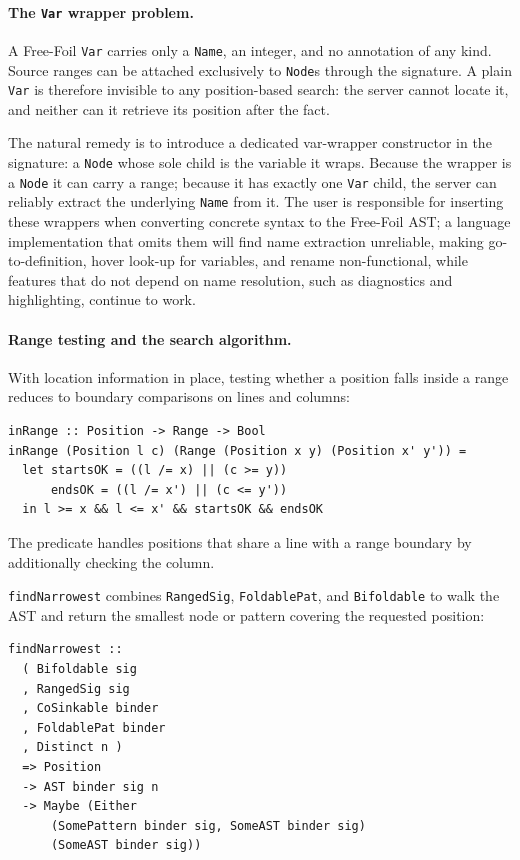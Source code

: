 \paragraph{The \texttt{Var} wrapper problem.}
A Free-Foil \texttt{Var} carries only a \texttt{Name}, an integer, and no annotation of any kind.
Source ranges can be attached exclusively to \texttt{Node}s through the signature.
A plain \texttt{Var} is therefore invisible to any position-based search: the server cannot locate it, and neither can it retrieve its position after the fact.

The natural remedy is to introduce a dedicated var-wrapper constructor in the signature: a \texttt{Node} whose sole child is the variable it wraps.
Because the wrapper is a \texttt{Node} it can carry a range; because it has exactly one \texttt{Var} child, the server can reliably extract the underlying \texttt{Name} from it.
The user is responsible for inserting these wrappers when converting concrete syntax to the Free-Foil AST; a language implementation that omits them will find name extraction unreliable, making go-to-definition, hover look-up for variables, and rename non-functional, while features that do not depend on name resolution, such as diagnostics and highlighting, continue to work.

\paragraph{Range testing and the search algorithm.}
With location information in place, testing whether a position falls inside a range reduces to boundary comparisons on lines and columns:

\begin{verbatim}
inRange :: Position -> Range -> Bool
inRange (Position l c) (Range (Position x y) (Position x' y')) =
  let startsOK = ((l /= x) || (c >= y))
      endsOK = ((l /= x') || (c <= y'))
  in l >= x && l <= x' && startsOK && endsOK
\end{verbatim}

The predicate handles positions that share a line with a range boundary by additionally checking the column.

\texttt{findNarrowest} combines \texttt{RangedSig}, \texttt{FoldablePat}, and \texttt{Bifoldable} to walk the AST and return the smallest node or pattern covering the requested position:

\begin{verbatim}
findNarrowest :: 
  ( Bifoldable sig
  , RangedSig sig
  , CoSinkable binder
  , FoldablePat binder
  , Distinct n )
  => Position
  -> AST binder sig n
  -> Maybe (Either 
      (SomePattern binder sig, SomeAST binder sig) 
      (SomeAST binder sig))
\end{verbatim}

